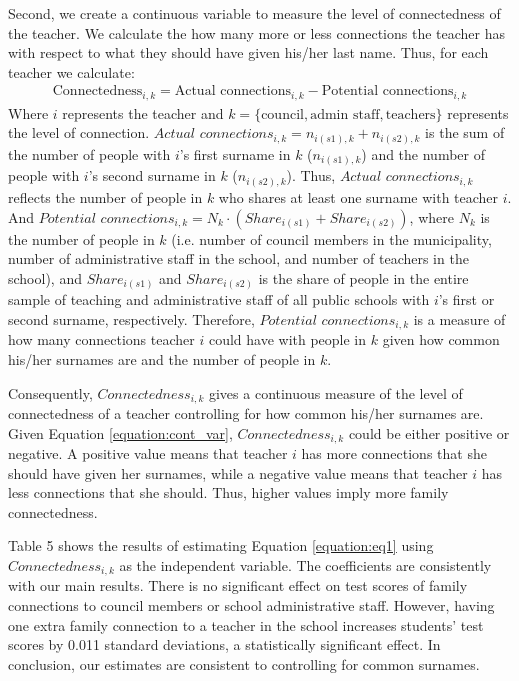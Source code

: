 \documentclass[12pt,runningheads]{article}
\begin{document}
Second, we create a continuous variable to measure the level of connectedness of the teacher. We calculate the how many more or less connections the teacher has with respect to what they should have given his/her last name. Thus, for each teacher we calculate:
\begin{align}
    \text{Connectedness}_{i,k} = \text{Actual connections}_{i,k} - \text{Potential connections}_{i,k}
 \label{equation:cont_var}
\end{align}
Where $i$ represents the teacher and $k = \{\text{council}, \text{admin staff}, \text{teachers}\}$ represents the level of connection. $\textit{Actual connections}_{i,k} = n_{i(s1),k}+n_{i(s2),k}$ is the sum of the number of people with $i$'s first surname in $k$ ($n_{i(s1),k}$) and the number of people with $i$'s second surname in $k$ ($n_{i(s2),k}$). Thus, $\textit{Actual connections}_{i,k}$ reflects the number of people in $k$ who shares at least one surname with teacher $i$. And $\textit{Potential connections}_{i,k} = N_k\cdot(Share_{i(s1)}+Share_{i(s2)})$, where $N_k$ is the number of people in $k$ (i.e. number of council members in the municipality, number of administrative staff in the school, and number of teachers in the school), and $Share_{i(s1)}$ and $Share_{i(s2)}$ is the share of people in the entire sample of teaching and administrative staff of all public schools with $i$'s first or second surname, respectively. Therefore, $\textit{Potential connections}_{i,k}$ is a measure of how many connections teacher $i$ could have with people in $k$ given how common his/her surnames are and the number of people in $k$. 

Consequently, $\textit{Connectedness}_{i,k}$ gives a continuous measure of the level of connectedness of a teacher controlling for how common his/her surnames are. Given Equation \ref{equation:cont_var}, $\textit{Connectedness}_{i,k}$ could be either positive or negative. A positive value means that teacher $i$ has more connections that she should have given her surnames, while a negative value means that teacher $i$ has less connections that she should. Thus, higher values imply more family connectedness. 

Table 5 shows the results of estimating Equation \ref{equation:eq1} using $\textit{Connectedness}_{i,k}$ as the independent variable. The coefficients are consistently with our main results. There is no significant effect on test scores of family connections to council members or school administrative staff. However, having one extra family connection to a teacher in the school increases students' test scores by 0.011 standard deviations, a statistically significant effect. In conclusion, our estimates are consistent to controlling for common surnames. 
\end{document}
